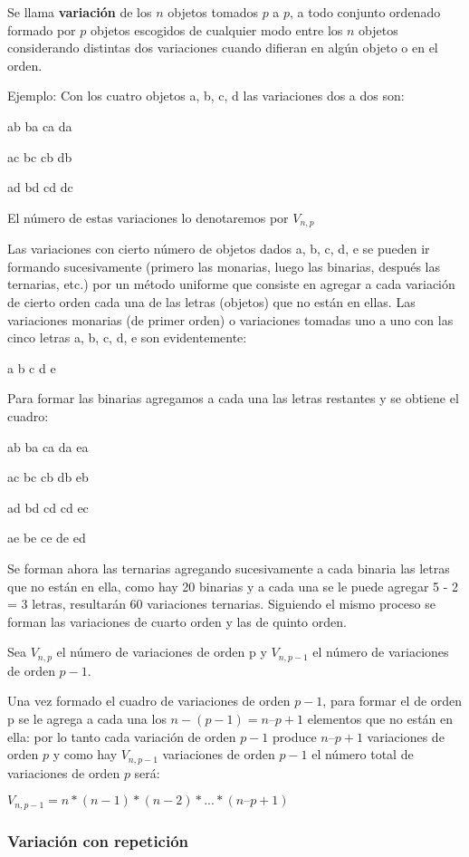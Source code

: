 Se llama {\bf variación} de los $n$ objetos tomados $p$ a $p$, a todo conjunto ordenado formado
por $p$ objetos escogidos de cualquier modo entre los $n$ objetos considerando distintas
dos variaciones cuando difieran en algún objeto o en el orden.

Ejemplo: Con los cuatro objetos a, b, c, d las variaciones dos a dos son:

ab ba ca da

ac bc cb db

ad bd cd dc

El número de estas variaciones lo denotaremos por $V_{n,p}$

Las variaciones con cierto número de objetos dados a, b, c, d, e se pueden ir
formando sucesivamente (primero las monarias, luego las binarias, después las
ternarias, etc.) por un método uniforme que consiste en agregar a cada variación de
cierto orden cada una de las letras (objetos) que no están en ellas.
Las variaciones monarias (de primer orden) o variaciones tomadas uno a uno con las
cinco letras a, b, c, d, e son evidentemente:

a b c d e

Para formar las binarias agregamos a cada una las letras restantes y se obtiene el
cuadro:

ab ba ca da ea

ac bc cb db eb

ad bd cd cd ec

ae be ce de ed

Se forman ahora las ternarias agregando sucesivamente a cada binaria las letras que
no están en ella, como hay 20 binarias y a cada una se le puede agregar 5 - 2 = 3
letras, resultarán 60 variaciones ternarias. Siguiendo el mismo proceso se forman las variaciones de cuarto orden y las de quinto
orden.

Sea $V_{n,p}$ el número de variaciones de orden p y $V_{n,p-1}$ el número de variaciones de orden $p-1$.

Una vez formado el cuadro de variaciones de orden $p-1$, para formar el de orden p se
le agrega a cada una los $n - (p - 1) = n – p + 1$ elementos que no están en ella: por
lo tanto cada variación de orden $p - 1$ produce $n – p + 1$ variaciones de orden $p$ y
como hay $V_{n,p-1}$  variaciones de orden $p-1$ el número total de variaciones de orden $p$ será:

$V_{n,p-1}=n*(n-1)*(n-2)* ... * (n–p+1)$ 

\subsubsection{Variación con repetición}

